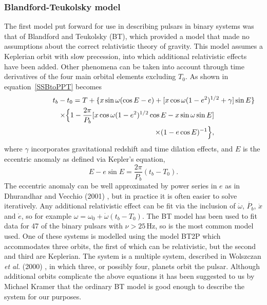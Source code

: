 \subsubsection{Blandford-Teukolsky model}
The first model put forward for use in describing pulsars in binary systems was that of Blandford
and Teukolsky \cite{BlandfordTeukolsky:1976} (BT), which provided a model that made no assumptions
about the correct relativistic theory of gravity. This model assumes a Keplerian orbit with slow
precession, into which additional relativistic effects have been added. Other phenomena can be taken
into account through time derivatives of the four main orbital elements excluding $T_0$. As shown in
\cite{TaylorWeisberg:1989} equation~\ref{SSBtoPPT} becomes
\begin{eqnarray}\label{BT}
\lefteqn{t_b - t_0 = T + \{x\sin{\omega}(\cos{E} - e) + [x\cos{\omega}(1-e^2)^{1/2} +
\gamma]\sin{E}\}} \nonumber \\
& & \times \Big\{1 - \frac{2\pi}{P_b}[x\cos{\omega}(1 - e^2)^{1/2} \cos{E} - x\sin{\omega}\sin{E}]
\nonumber \\
& & \times (1 - e\cos{E})^{-1}\Big\},
\end{eqnarray}
where $\gamma$ incorporates gravitational redshift and time dilation effects, and $E$ is the
eccentric anomaly as defined via Kepler's equation,
\begin{equation}\label{KeplersEquation}
E - e\sin{}E = \frac{2\pi}{P_b}(t_b - T_0).
\end{equation}
The eccentric anomaly can be well approximated by power series in $e$ as in Dhurandhar and Vecchio
(2001) \cite{DhurandharVecchio:2001}, but in practice it is often easier to solve iteratively. Any
additional relativistic effect can be fit via the inclusion of $\dot{\omega}$, $\dot{P_b}$,
$\dot{x}$ and $\dot{e}$, so for example $\omega = \omega_0 + \dot{\omega}(t_b - T_0)$. The BT model
has been used to fit data for 47 of the binary pulsars with $\nu > 25$\,Hz, so is the most common
model used. One of these systems is modelled using the \tempo model BT2P which accommodates three
orbits, the first of which can be relativistic, but the second and third are Keplerian. The system
is a multiple system, described in Wolszczan {\it et al.} (2000) \cite{Wolszczan:2000}, in which
three, or possibly four, planets orbit the pulsar. Although additional orbits complicate the above
equations it has been suggested to us by Michael Kramer \cite{Kramer:2004} that the ordinary BT
model is good enough to describe the system for our purposes.

